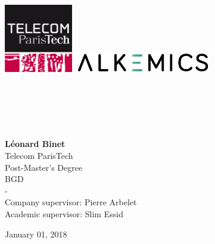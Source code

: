 
\begin{titlepage}

\begin{center}

\begin{center}
    \includegraphics[height=3cm]{images/logo-telecom-paristech.png}
    \includegraphics[width=6cm]{images/Logo-Alkemics.png}
\end{center}

\vspace{160pt}

\textsc{\Large \reportsubject}\\[0.5cm]
\HRule \\[0.4cm]
{\huge \bfseries \reporttitle}\\[0.4cm]
\HRule \\[1.5cm]

\vspace{50pt}

 \large{\textbf{Léonard Binet} \\ Telecom ParisTech \\ Post-Master's Degree \\ BGD \\ \vspace{0.25cm} - \vspace{0.25cm} \\
  Company supervisor: Pierre Arbelet \\ Academic supervisor: Slim Essid}

\vfill

{\large January 01, 2018}

\end{center}

\end{titlepage}
